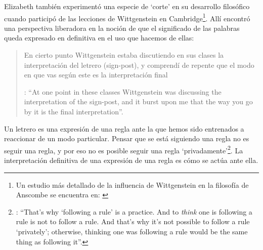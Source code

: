 Elizabeth también experimentó una especie de `corte' en su desarrollo filosófico cuando participó de las lecciones de Wittgenstein en Cambridge\footnote{Un estudio más detallado de la influencia de Wittgenstein en la filosofía de Anscombe se encuentra en: \Cite[37-95]{grimi2014dl}}. Allí encontró una perspectiva liberadora en la noción de que el significado de las palabras queda expresado en definitiva en el uso que hacemos de ellas: \blockquote[{\Cite[viii]{anscombe1981metaphysics}}: \enquote{At one point in these classes Wittgenstein was discussing the interpretation of the sign-post, and it burst upon me that the way you go by it is the final interpretation}.]{En cierto punto Wittgenstein estaba discutiendo en sus clases la interpretación del letrero (sign-post), y comprendí de repente que el modo en que vas según este es la interpretación final}. Un letrero es una expresión de una regla ante la que hemos sido entrenados a reaccionar de un modo particular. Pensar que se está siguiendo una regla no es seguir una regla, y por eso no es posible seguir una regla `privadamente'\footnote{\cite[Cf.][\S202]{wittgenstein1953phiinv}: \enquote{That's why `following a rule' is a practice. And to \emph{think} one is following a rule is not to follow a rule. And that's why it's not possible to follow a rule `privately'; otherwise, thinking one was following a rule would be the same thing as following it}.}. La interpretación definitiva de una expresión de una regla es cómo se actúa ante ella.

